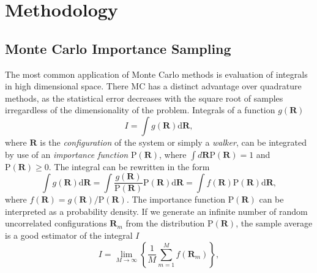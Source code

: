 
\chapter{Methodology}
\label{chapter3}

\ifpdf
    \graphicspath{{Chapter3/Figs/Raster/}{Chapter3/Figs/PDF/}{Chapter3/Figs/}}
\else
    \graphicspath{{Chapter3/Figs/Vector/}{Chapter3/Figs/}}
\fi

\section{Monte Carlo Importance Sampling}
\label{sec:Impl-MCIP}
The most common application of Monte Carlo methods is evaluation of integrals in high dimensional space. There MC has a distinct advantage over quadrature methods, as the statistical error decreases with the square root of samples irregardless of the dimensionality of the problem. Integrals of a function $g(\mathbf{R})$
\begin{equation}
	I=\int g(\mathbf{R}) \mathrm{d} \mathbf{R},
\end{equation}
where $\mathbf{R}$ is the \emph{configuration} of the system or simply a \emph{walker}, can be integrated by use of an \emph{importance function} $\mathrm{P}(\mathbf{R})$, where $\int d \mathbf{R} \text{P}(\mathbf{R})=1$ and $\mathrm{P} (\mathbf{R}) \geq 0$. The integral can be rewritten in the form
\begin{equation}
	\int g(\mathbf{R}) \mathrm{d} \mathbf{R} = \int \frac{g(\mathbf{R})}{\mathrm{P}(\mathbf{R})} \mathrm{P}(\mathbf{R}) \mathrm{d} \mathbf{R} = \int f(\mathbf{R})\mathrm{P}(\mathbf{R}) \mathrm{d} \mathbf{R},
\end{equation}
where $f(\mathbf{R}) = g(\mathbf{R}) / \mathrm{P}(\mathbf{R})$.
The importance function $\mathrm{P}(\mathbf{R})$ can be interpreted as a probability density. If we generate an infinite number of random uncorrelated configurations $\mathbf{R}_m$ from the distribution $\mathrm{P}(\mathbf{R})$, the sample average is a good estimator of the integral $I$
\begin{equation}
	I=\lim _{M \rightarrow \infty}\left\{\frac{1}{M} \sum_{m=1}^{M} f\left(\mathbf{R}_{m}\right)\right\},
\end{equation}
